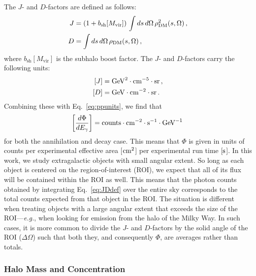 The $J$- and $D$-factors are defined as follows:
\begin{equation}\begin{aligned}
J &= \left(1+b_\text{sh}[M_\text{vir}]\right)\,\int ds \, d\Omega \,\rho_{\rm DM}^2(s,\Omega) \,, \\
D &= \int ds\, d\Omega\, \rho_{\rm DM}(s,\Omega)\,,
\label{eq:JDdef}
\end{aligned}\end{equation}
where $b_\text{sh}[M_\text{vir}]$ is the subhalo boost factor.  The $J$- and $D$-factors carry the following units:
\begin{equation}\begin{aligned}
\left[ J \right] &= {\rm GeV}^2 \cdot {\rm cm}^{-5} \cdot {\rm sr}\,, \\
\left[ D \right] &= {\rm GeV} \cdot {\rm cm}^{-2} \cdot {\rm sr}\,.
\end{aligned}\end{equation}
Combining these with Eq.~\ref{eq:ppunits}, we find that 
\begin{equation}
\left[ \frac{d\Phi}{dE_{\gamma}} \right] = {\rm counts} \cdot {\rm cm}^{-2} \cdot {\rm s}^{-1} \cdot {\rm GeV}^{-1}\,
\end{equation}
for both the annihilation and decay case.  This means that $\Phi$ is given in units of counts per experimental effective area [${\rm cm}^2$] per experimental run time [${\rm s}$].  
In this work, we study extragalactic objects with small angular extent.  So long as each object is centered on the region-of-interest (ROI), we expect that all of its flux will be contained within the ROI as well.  This means that the photon counts obtained by integrating Eq.~\ref{eq:JDdef} over the entire sky corresponds to the total counts expected from that object in the ROI.  The situation is different when treating objects with a large angular extent that exceeds the size of the ROI---\emph{e.g.}, when looking for emission from the halo of the Milky Way.  In such cases, it is more common to divide the $J$- and $D$-factors by the solid angle of the ROI ($\Delta \Omega$) such that both they, and consequently $\Phi$, are averages rather than totals.  

\subsubsection{Halo Mass and Concentration}

